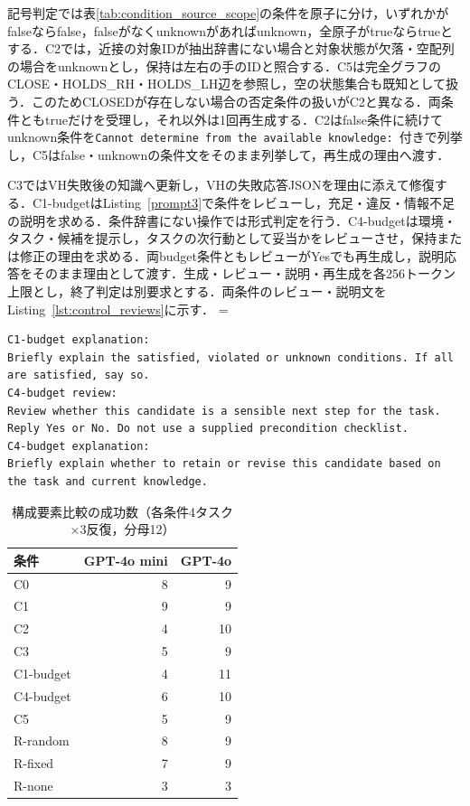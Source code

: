 記号判定では表\ref{tab:condition_source_scope}の条件を原子に分け，いずれかがfalseならfalse，falseがなくunknownがあればunknown，全原子がtrueならtrueとする．C2では，近接の対象IDが抽出辞書にない場合と対象状態が欠落・空配列の場合をunknownとし，保持は左右の手のIDと照合する．C5は完全グラフのCLOSE・HOLDS\_RH・HOLDS\_LH辺を参照し，空の状態集合も既知として扱う．このためCLOSEDが存在しない場合の否定条件の扱いがC2と異なる．両条件ともtrueだけを受理し，それ以外は1回再生成する．C2はfalse条件に続けてunknown条件を\texttt{Cannot determine from the available knowledge: }付きで列挙し，C5はfalse・unknownの条件文をそのまま列挙して，再生成の理由へ渡す．

C3ではVH失敗後の知識へ更新し，VHの失敗応答JSONを理由に添えて修復する．C1-budgetはListing~\ref{prompt3}で条件をレビューし，充足・違反・情報不足の説明を求める．条件辞書にない操作では形式判定を行う．C4-budgetは環境・タスク・候補を提示し，タスクの次行動として妥当かをレビューさせ，保持または修正の理由を求める．両budget条件ともレビューがYesでも再生成し，説明応答をそのまま理由として渡す．生成・レビュー・説明・再生成を各256トークン上限とし，終了判定は別要求とする．両条件のレビュー・説明文をListing~\ref{lst:control_reviews}に示す．
\begingroup
\capwidth=\linewidth
\begin{lstlisting}[basicstyle=\ttfamily\scriptsize,columns=fullflexible,caption={budget条件のレビュー・説明指示},label=lst:control_reviews]
C1-budget explanation:
Briefly explain the satisfied, violated or unknown conditions. If all are satisfied, say so.
C4-budget review:
Review whether this candidate is a sensible next step for the task. Reply Yes or No. Do not use a supplied precondition checklist.
C4-budget explanation:
Briefly explain whether to retain or revise this candidate based on the task and current knowledge.
\end{lstlisting}
\endgroup

\begin{table}[tb]
\caption{構成要素比較の成功数（各条件4タスク$\times$3反復，分母12）}\label{tab:step4_pilot}
\centering\small
\begin{tabular}{lrr}
\hline
条件 & GPT-4o mini & GPT-4o \\
\hline
C0 & 8 & 9 \\
C1 & 9 & 9 \\
C2 & 4 & 10 \\
C3 & 5 & 9 \\
C1-budget & 4 & 11 \\
C4-budget & 6 & 10 \\
C5 & 5 & 9 \\
R-random & 8 & 9 \\
R-fixed & 7 & 9 \\
R-none & 3 & 3 \\
\hline
\end{tabular}
\end{table}

